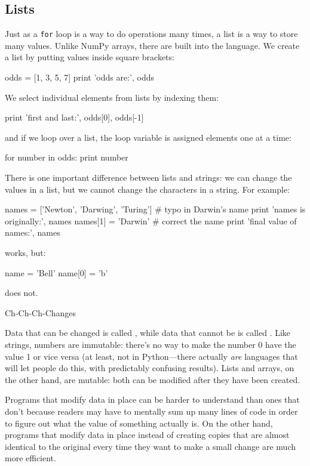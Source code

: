 \documentclass{book}
\begin{document}
\subsection{Lists}

Just as a \texttt{for} loop is a way to do operations many times, a list
is a way to store many values. Unlike NumPy arrays, there are built into
the language. We create a list by putting values inside square brackets:

\begin{VerbIn}
odds = [1, 3, 5, 7]
print 'odds are:', odds
\end{VerbIn}

We select individual elements from lists by indexing them:

\begin{VerbIn}
print 'first and last:', odds[0], odds[-1]
\end{VerbIn}

and if we loop over a list, the loop variable is assigned elements one
at a time:

\begin{VerbIn}
for number in odds:
    print number
\end{VerbIn}

There is one important difference between lists and strings: we can
change the values in a list, but we cannot change the characters in a
string. For example:

\begin{VerbIn}
names = ['Newton', 'Darwing', 'Turing'] # typo in Darwin's name
print 'names is originally:', names
names[1] = 'Darwin' # correct the name
print 'final value of names:', names
\end{VerbIn}

works, but:

\begin{VerbIn}
name = 'Bell'
name[0] = 'b'
\end{VerbIn}

does not.

\begin{swcbox}{Ch-Ch-Ch-Changes}

Data that can be changed is called , while
data that cannot be is called . Like
strings, numbers are immutable: there's no way to make the number 0 have
the value 1 or vice versa (at least, not in Python---there actually
\emph{are} languages that will let people do this, with predictably
confusing results). Lists and arrays, on the other hand, are mutable:
both can be modified after they have been created.

Programs that modify data in place can be harder to understand than ones
that don't because readers may have to mentally sum up many lines of
code in order to figure out what the value of something actually is. On
the other hand, programs that modify data in place instead of creating
copies that are almost identical to the original every time they want to
make a small change are much more efficient.

\end{swcbox}
\end{document}
